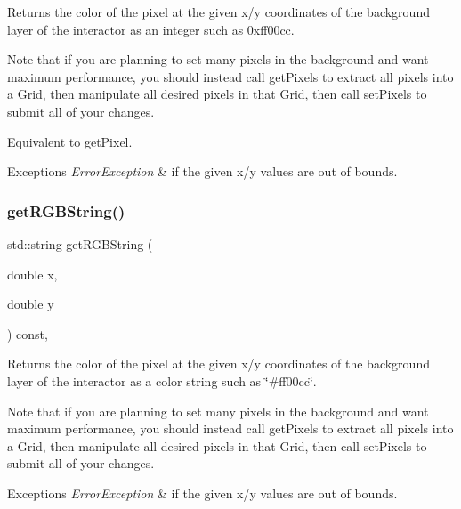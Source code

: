 Returns the color of the pixel at the given x/y coordinates of the background layer of the interactor as an integer such as 0xff00cc. 

Note that if you are planning to set many pixels in the background and want maximum performance, you should instead call get\+Pixels to extract all pixels into a Grid, then manipulate all desired pixels in that Grid, then call set\+Pixels to submit all of your changes.

Equivalent to get\+Pixel.


\begin{DoxyExceptions}{Exceptions}
{\em Error\+Exception} & if the given x/y values are out of bounds. \\
\hline
\end{DoxyExceptions}
\mbox{\label{classGDrawingSurface_a456d3582acc3544f37d939f5cb8802fe}} 
\subsubsection{\texorpdfstring{get\+R\+G\+B\+String()}{getRGBString()}}
{\footnotesize\ttfamily std\+::string get\+R\+G\+B\+String (\begin{DoxyParamCaption}\item[{double}]{x,  }\item[{double}]{y }\end{DoxyParamCaption}) const\hspace{0.3cm}{\ttfamily [virtual]}, {\ttfamily [inherited]}}



Returns the color of the pixel at the given x/y coordinates of the background layer of the interactor as a color string such as \char`\"{}\#ff00cc\char`\"{}. 

Note that if you are planning to set many pixels in the background and want maximum performance, you should instead call get\+Pixels to extract all pixels into a Grid, then manipulate all desired pixels in that Grid, then call set\+Pixels to submit all of your changes.


\begin{DoxyExceptions}{Exceptions}
{\em Error\+Exception} & if the given x/y values are out of bounds. \\
\hline
\end{DoxyExceptions}
\mbox{\label{classGInteractor_a7b4eec96a2bdc6420695d5796a78eea9}} 
